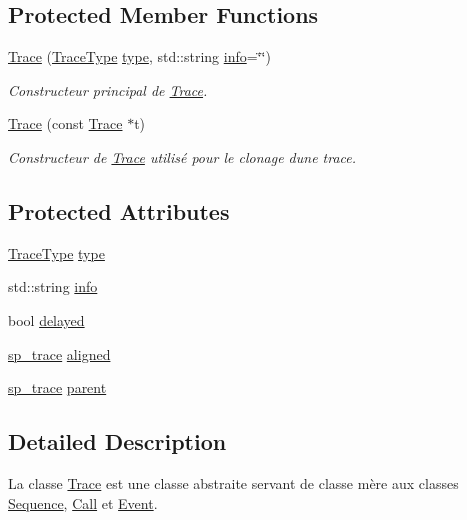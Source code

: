 \subsection*{Protected Member Functions}
\begin{DoxyCompactItemize}
\item 
\hyperlink{class_trace_a1891c08c9e847b798d2e39f49b2d24b5}{Trace} (\hyperlink{class_trace_a39e5f82f2243958348cc74d7cdae527c}{Trace\+Type} \hyperlink{class_trace_a9f90324e4302d53892143da44cc63054}{type}, std\+::string \hyperlink{class_trace_a4835dcfa7da5d4c971e8f7d6860acb09}{info}=\char`\"{}\char`\"{})
\begin{DoxyCompactList}\small\item\em Constructeur principal de \hyperlink{class_trace}{Trace}. \end{DoxyCompactList}\item 
\hyperlink{class_trace_a586ba22dd795fc2d6ff874d9f7d52929}{Trace} (const \hyperlink{class_trace}{Trace} $\ast$t)
\begin{DoxyCompactList}\small\item\em Constructeur de \hyperlink{class_trace}{Trace} utilisé pour le clonage d\textquotesingle{}une trace. \end{DoxyCompactList}\end{DoxyCompactItemize}
\subsection*{Protected Attributes}
\begin{DoxyCompactItemize}
\item 
\hyperlink{class_trace_a39e5f82f2243958348cc74d7cdae527c}{Trace\+Type} \hyperlink{class_trace_a9f90324e4302d53892143da44cc63054}{type}
\item 
std\+::string \hyperlink{class_trace_a4835dcfa7da5d4c971e8f7d6860acb09}{info}
\item 
bool \hyperlink{class_trace_a9757057cc65f9e45bbeaa848cb06d5a1}{delayed}
\item 
\hyperlink{class_trace_a9c58e523529fc8a03fb6acf3eef86150}{sp\+\_\+trace} \hyperlink{class_trace_a4ace0a20ceb2b0722970be729bd41dc8}{aligned}
\item 
\hyperlink{class_trace_a9c58e523529fc8a03fb6acf3eef86150}{sp\+\_\+trace} \hyperlink{class_trace_a52648b4a6c117072f5797c0e31518f24}{parent}
\end{DoxyCompactItemize}


\subsection{Detailed Description}
La classe \hyperlink{class_trace}{Trace} est une classe abstraite servant de classe mère aux classes \hyperlink{class_sequence}{Sequence}, \hyperlink{class_call}{Call} et \hyperlink{class_event}{Event}. 

